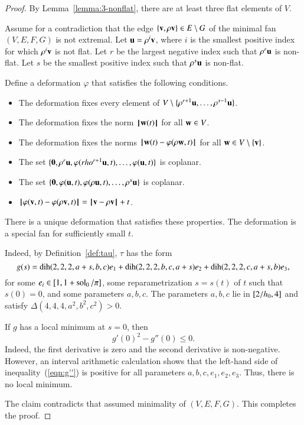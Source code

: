 \begin{proof} 
By Lemma~\ref{lemma:3-nonflat}, there are at least three flat elements of $V$.

Assume for a contradiction that the edge $\{{\mathbf v},\rho{\mathbf v}\}\in E\setminus G$ of the minimal fan $(V,E,F,G)$ is not extremal.  Let ${\mathbf u} = \rho^i{\mathbf v}$, where $i$ is the smallest positive index for which $\rho^i{\mathbf v}$ is not flat.
Let $r$ be the largest negative index such that
$\rho^r{\mathbf u}$ is non-flat.  Let $s$ be the smallest positive index such that
$\rho^s{\mathbf u}$ is non-flat.

Define a deformation $\varphi$ that satisfies the following conditions.
\begin{itemize}
\item The deformation fixes every element of $V\setminus\{\rho^{r+1}{\mathbf u},\ldots,\rho^{s-1}{\mathbf u}\}$.  
\item The deformation  fixes the norm ${{\hskip0.1em|\hskip-0.15em|\hskip0.1em}{\mathbf w}(t){\hskip0.1em|\hskip-0.15em|\hskip0.1em}}$ for all ${\mathbf w}\in V$.  
\item The deformation  fixes the norms ${\hskip0.1em|\hskip-0.15em|\hskip0.1em}{\mathbf w}(t) - \varphi(\rho {\mathbf w},t){\hskip0.1em|\hskip-0.15em|\hskip0.1em}$ for all ${\mathbf w}\in V\setminus\{{\mathbf v}\}$.  
\item The set $\{{\mathbf 0},\rho^r{\mathbf u},\varphi(rho^{r+1}{\mathbf u},t),\ldots,\varphi({\mathbf u},t)\}$ is coplanar.
\item The set $\{{\mathbf 0},\varphi({\mathbf u},t),\varphi(\rho{\mathbf u},t),\ldots,\rho^s{\mathbf u}\}$ is coplanar.
\item ${\hskip0.1em|\hskip-0.15em|\hskip0.1em}\varphi({\mathbf v},t) - \varphi(\rho{\mathbf v},t){\hskip0.1em|\hskip-0.15em|\hskip0.1em} = {\hskip0.1em|\hskip-0.15em|\hskip0.1em}{\mathbf v} - \rho{\mathbf v}{\hskip0.1em|\hskip-0.15em|\hskip0.1em}+t$.
\end{itemize}
There is a unique deformation that satisfies these properties.  The deformation is a special fan for sufficiently small $t$.

Indeed,  by Definition~\ref{def:tau}, $\tau$ has the form
$$
g(s) = \operatorname{dih}(2,2,2,a+s,b,c) e_1 + \operatorname{dih}(2,2,2,b,c,a+s) e_2 + \operatorname{dih}(2,2,2,c,a+s,b) e_3,
$$
for some $e_i\in[1,1+\operatorname{sol}_0/\pi]$, some reparametrization $s=s(t)$ of $t$ such that $s(0)=0$, and some parameters $a,b,c$.
The parameters $a,b,c$ lie in $[2/{h_0},4]$ and satisfy $\Delta(4,4,4,a^2,b^2,c^2)>0$.

If $g$ has a local minimum at $s=0$, then
\begin{equation}\label{eqn:g''}
g'(0)^2 - g''(0) \le 0.
\end{equation}
Indeed, the first derivative is zero and the second derivative is non-negative.
However, an interval arithmetic calculation %
shows that the left-hand side of inequality~(\ref{eqn:g''}) is positive for all parameters $a,b,c,e_1,e_2,e_3$.
Thus, there is no local minimum.

The claim contradicts that assumed minimality of $(V,E,F,G)$.  This completes the proof.  
\end{proof}


